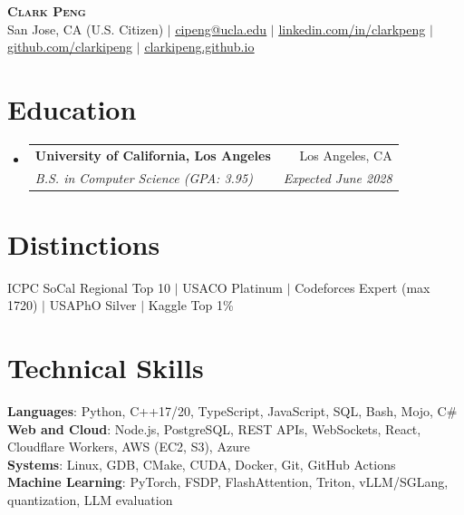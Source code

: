 \documentclass[letterpaper,11pt]{article}
\makeatletter
\newcommand{\resumeSubheading}[4]{
  \vspace{-2pt}\item
  \begin{tabular*}{0.97\textwidth}[t]{l@{\extracolsep{\fill}}r}
    \textbf{#1} & #2 \\
    \textit{\small#3} & \textit{\small #4} \\
  \end{tabular*}\vspace{-7pt}
}
\newcommand{\resumeSubHeadingListStart}{\begin{itemize}[leftmargin=0.05in, label={}]}
\newcommand{\resumeSubHeadingListEnd}{\end{itemize}\vspace{-10pt}}
\makeatother
\begin{document}
\begin{center}
    \textbf{\Huge \scshape Clark Peng} \\ \vspace{1pt}
    \small San Jose, CA (U.S. Citizen) $|$
    \href{mailto:cipeng@ucla.edu}{\underline{cipeng@ucla.edu}} $|$
    \href{https://linkedin.com/in/clarkpeng}{\underline{linkedin.com/in/clarkpeng}} $|$
    \href{https://github.com/clarkipeng}{\underline{github.com/clarkipeng}} $|$
    \href{https://clarkipeng.github.io}{\underline{clarkipeng.github.io}}
\end{center}

\section{Education}
  \resumeSubHeadingListStart
    \resumeSubheading
      {University of California, Los Angeles}{Los Angeles, CA}
      {B.S. in Computer Science (GPA: 3.95)}{Expected June 2028}
  \resumeSubHeadingListEnd

\section{Distinctions}
  \begin{itemize}[leftmargin=0.15in, label={}]
    \small{\item{
      ICPC SoCal Regional Top 10 $|$ USACO Platinum $|$ Codeforces Expert (max 1720) $|$ USAPhO Silver $|$ Kaggle Top 1\%
    }}
 \end{itemize}

\section{Technical Skills}
 \begin{itemize}[leftmargin=0.15in, label={}]
    \small{\item{
     \textbf{Languages}{: Python, C++17/20, TypeScript, JavaScript, SQL, Bash, Mojo, C\#} \\
     \textbf{Web and Cloud}{: Node.js, PostgreSQL, REST APIs, WebSockets, React, Cloudflare Workers, AWS (EC2, S3), Azure} \\
     \textbf{Systems}{: Linux, GDB, CMake, CUDA, Docker, Git, GitHub Actions} \\
     \textbf{Machine Learning}{: PyTorch, FSDP, FlashAttention, Triton, vLLM/SGLang, quantization, LLM evaluation}
    }}
 \end{itemize}
\end{document}

